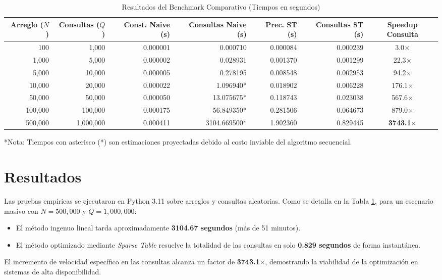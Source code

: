 \documentclass[twocolumn]{article}
\begin{document}
\begin{table}[t]
\centering
\caption{Resultados del Benchmark Comparativo (Tiempos en segundos)}
\label{tab:benchmark}
\begin{tabular}{rrrrrrc}
\toprule
\textbf{Arreglo ($N$)} & \textbf{Consultas ($Q$)} & \textbf{Const. Naive (s)} & \textbf{Consultas Naive (s)} & \textbf{Prec. ST (s)} & \textbf{Consultas ST (s)} & \textbf{Speedup Consulta} \\
\midrule
100 & 1,000 & 0.000001 & 0.000710 & 0.000084 & 0.000239 & 3.0$\times$ \\
1,000 & 5,000 & 0.000002 & 0.028931 & 0.001370 & 0.001299 & 22.3$\times$ \\
5,000 & 10,000 & 0.000005 & 0.278195 & 0.008548 & 0.002953 & 94.2$\times$ \\
10,000 & 20,000 & 0.000022 & 1.096940* & 0.018902 & 0.006228 & 176.1$\times$ \\
50,000 & 50,000 & 0.000050 & 13.075675* & 0.118743 & 0.023038 & 567.6$\times$ \\
100,000 & 100,000 & 0.000175 & 56.849350* & 0.281506 & 0.064673 & 879.0$\times$ \\
500,000 & 1,000,000 & 0.000411 & 3104.669500* & 1.902360 & 0.829445 & \textbf{3743.1$\times$} \\
\bottomrule
\end{tabular}
\newline
\small{*Nota: Tiempos con asterisco (*) son estimaciones proyectadas debido al costo inviable del algoritmo secuencial.}
\end{table}

\section{Resultados}
Las pruebas empíricas se ejecutaron en Python 3.11 sobre arreglos y consultas aleatorias. Como se detalla en la Tabla \ref{tab:benchmark}, para un escenario masivo con $N = 500,000$ y $Q = 1,000,000$:
\begin{itemize}
    \item El método ingenuo lineal tarda aproximadamente \textbf{3104.67 segundos} (más de 51 minutos).
    \item El método optimizado mediante \textit{Sparse Table} resuelve la totalidad de las consultas en solo \textbf{0.829 segundos} de forma instantánea.
\end{itemize}

El incremento de velocidad específico en las consultas alcanza un factor de \textbf{3743.1$\times$}, demostrando la viabilidad de la optimización en sistemas de alta disponibilidad.
\end{document}

